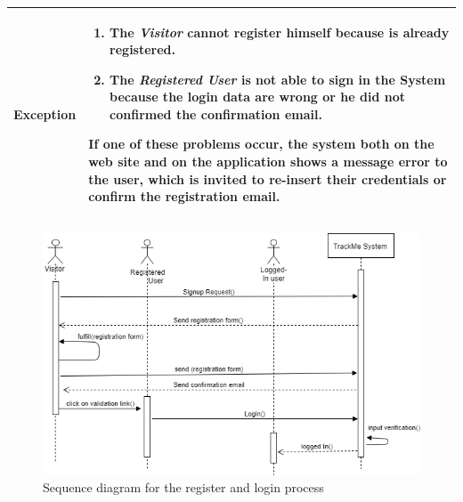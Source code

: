 \begin{table}[H]
\begin{tabular}{|p{3.5cm}|p{10.3cm}|}
    \hline
    \textbf{\large{Exception}} 			& \begin{enumerate}[leftmargin=0.5cm]
                                          	\item The \emph{Visitor} cannot register himself because is already registered.
                                          	\item The \emph{Registered User} is not able to sign in the System because the login data are wrong or he did not confirmed the confirmation email.
                                            \end{enumerate}
    										If one of these problems occur, the system both on the web site and on the application shows a message error to the user, which is invited to re-insert their credentials or confirm the registration email.\\
    
    \hline
    
    \end{tabular}
	
\end{table}
\begin{figure}[H]

    \centering
    \includegraphics[scale=0.4]{rasdL/Pictures/login1.png}
    \caption{Sequence diagram for the register and login process}
    
\end{figure}

